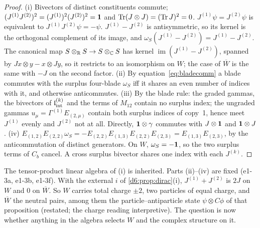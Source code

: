 \begin{proof}
(i) Bivectors of distinct constituents commute; $(J^{(1)}J^{(2)})^2=(J^{(1)})^2(J^{(2)})^2=\mathbf 1$ and $\operatorname{Tr}(J\otimes J)=(\operatorname{Tr} J)^2=0$. $J^{(1)}\psi=J^{(2)}\psi$ is
equivalent to $J^{(1)}J^{(2)}\psi=-\psi$. $J^{(1)}-J^{(2)}$ is antisymmetric, so its kernel is the orthogonal complement of its image, and
$\omega_S(J^{(1)}-J^{(2)})=J^{(1)}-J^{(2)}$. The canonical map $S\otimes_{\mathbb{R}} S\to S\otimes_{\mathbb{C}} S$ has kernel $\operatorname{im}(J^{(1)}-J^{(2)})$, spanned by
$Jx\otimes y-x\otimes Jy$, so it restricts to an isomorphism on $W$; the case of $\overline W$ is the same with $-J$ on the second factor. (ii)
By equation~\cref{eq:bladecomm} a blade commutes with the surplus four-blade $\omega_S$ iff it shares an even number of indices with it, and
otherwise anticommutes. (iii) By the blade rule: the graded gammas, the bivectors of $\mathfrak l_{\rm int}^{(k)}$ and the terms of $M_{12}$ contain no
surplus index; the ungraded gammas $u_\mu=\Gamma^{(1)}E_{(2,\mu)}$ contain both surplus indices of copy~1, hence meet $J^{(1)}$ evenly and
$J^{(2)}$ not at all. Directly, $\mathbf 1\otimes\gamma$ commutes with $J\otimes\mathbf 1$ and $\mathbf 1\otimes J$. (iv) $E_{(1,2)}E_{(2,2)}\omega_S=-E_{(2,2)}E_{(1,3)}E_{(2,2)}E_{(2,3)}=E_{(1,3)}E_{(2,3)}$, by the anticommutation of distinct
generators. On $W$, $\omega_S=-\mathbf 1$, so the two surplus terms of $C_b$ cancel. A cross surplus bivector shares one index
with each $J^{(k)}$.
\end{proof}

The tensor-product linear algebra of (i) is inherited. Parts (ii)--(iv) are fixed (e1-3a, e1-3b, e1-3f). With the external $i$ of
\cref{d6:prop:dirac}(i), $J^{(1)}+J^{(2)}$ is $2J$ on $W$ and $0$ on $\overline W$. So $W$ carries total charge $\pm2$, two particles
of equal charge, and $\overline W$ the neutral pairs, among them the particle--antiparticle state $\psi\otimes C\phi$ of that proposition
(restated; the charge reading interpretive). The question is now whether anything in the algebra selects $W$ and the complex
structure on it.

